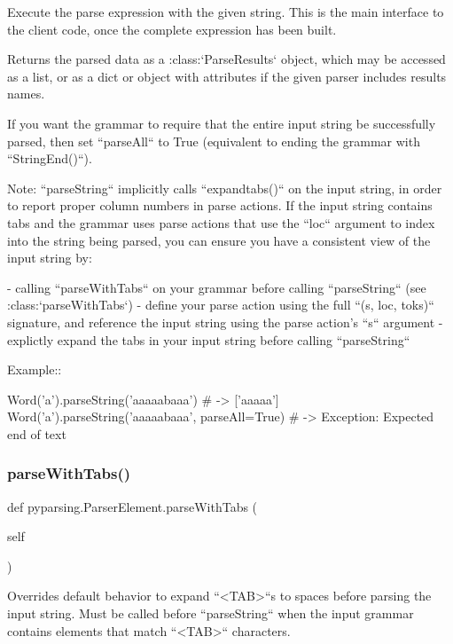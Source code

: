 \begin{DoxyVerb}Execute the parse expression with the given string.
This is the main interface to the client code, once the complete
expression has been built.

Returns the parsed data as a :class:`ParseResults` object, which may be
accessed as a list, or as a dict or object with attributes if the given parser
includes results names.

If you want the grammar to require that the entire input string be
successfully parsed, then set ``parseAll`` to True (equivalent to ending
the grammar with ``StringEnd()``).

Note: ``parseString`` implicitly calls ``expandtabs()`` on the input string,
in order to report proper column numbers in parse actions.
If the input string contains tabs and
the grammar uses parse actions that use the ``loc`` argument to index into the
string being parsed, you can ensure you have a consistent view of the input
string by:

- calling ``parseWithTabs`` on your grammar before calling ``parseString``
  (see :class:`parseWithTabs`)
- define your parse action using the full ``(s, loc, toks)`` signature, and
  reference the input string using the parse action's ``s`` argument
- explictly expand the tabs in your input string before calling
  ``parseString``

Example::

    Word('a').parseString('aaaaabaaa')  # -> ['aaaaa']
    Word('a').parseString('aaaaabaaa', parseAll=True)  # -> Exception: Expected end of text
\end{DoxyVerb}
 \mbox{\label{classpyparsing_1_1ParserElement_af81ca1164a8903a8595c1bfec35316cd}} 
\subsubsection{\texorpdfstring{parse\+With\+Tabs()}{parseWithTabs()}}
{\footnotesize\ttfamily def pyparsing.\+Parser\+Element.\+parse\+With\+Tabs (\begin{DoxyParamCaption}\item[{}]{self }\end{DoxyParamCaption})}

\begin{DoxyVerb}Overrides default behavior to expand ``<TAB>``s to spaces before parsing the input string.
Must be called before ``parseString`` when the input grammar contains elements that
match ``<TAB>`` characters.
\end{DoxyVerb}
 \mbox{\label{classpyparsing_1_1ParserElement_a3b6548ce7bb9df91108b4f923c25137c}} 
